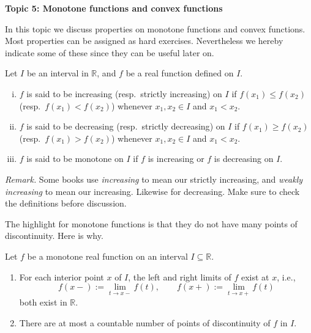\documentclass[11pt]{article}
\begin{document}
\begin{center}
  \textbf{Topic 5: Monotone functions and convex functions}
\end{center}

In this topic we discuss properties on monotone functions and convex functions.
Most properties can be assigned as hard exercises.
Nevertheless we hereby indicate some of these since they can be useful later on.

\begin{defn}
  Let $I$ be an interval in $\mathbb{R}$, and $f$ be a real function defined on $I$.
  \begin{enumerate}[(i)]
    \item $f$ is said to be \textsf{increasing} (resp.\ \textsf{strictly increasing}) on $I$ if $f(x_1) \leqslant f(x_2)$ (resp.\ $f(x_1) < f(x_2)$) whenever $x_1, x_2 \in I$ and $x_1 < x_2$.
  
    \item $f$ is said to be \textsf{decreasing} (resp.\ \textsf{strictly decreasing}) on $I$ if $f(x_1) \geqslant f(x_2)$ (resp.\ $f(x_1) > f(x_2)$) whenever $x_1, x_2 \in I$ and $x_1 < x_2$.
      \item $f$ is said to be \textsf{monotone} on $I$ if $f$ is increasing or $f$ is decreasing on $I$.
  \end{enumerate}
\end{defn}

\noindent\textit{Remark.} Some books use {\em increasing} to mean our strictly increasing, and {\em weakly increasing} to mean our increasing.  Likewise for decreasing.
Make sure to check the definitions before discussion.

The highlight for monotone functions is that they do not have many points of discontinuity.  Here is why. 
\begin{prop}
  Let $f$ be a monotone real function on an interval $I \subseteq \mathbb{R}$.
  \begin{enumerate}[$(a)$]
    \item For each interior point $x$ of $I$, the left and right limits of $f$ exist at $x$, i.e.,
      \[
	f(x-) := \lim_{t \to x-} f(t), \qquad
	f(x+) := \lim_{t \to x+} f(t)
      \]
      both exist in $\mathbb{R}$.

    \item There are at most a countable number of points of discontinuity of $f$ in $I$.
  \end{enumerate}
\end{prop}
\end{document}
